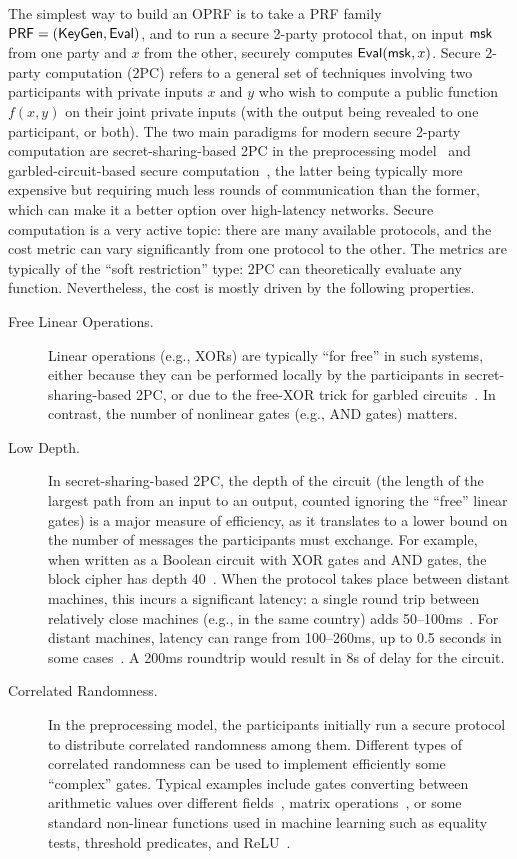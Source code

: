 The simplest way to build an OPRF is to take a PRF family $\mathsf{PRF} = (\mathsf{KeyGen}, \mathsf{Eval})$, and to run a secure 2-party protocol that, on input $\mathsf{msk}$ from one party and $x$ from the other, securely computes $\mathsf{Eval}(\mathsf{msk},x)$. Secure $2$-party computation (2PC) refers to a general set of techniques involving two participants with private inputs $x$ and $y$ who wish to compute a public function $f(x,y)$ on their joint private inputs (with the output being revealed to one participant, or both). The two main paradigms for modern secure 2-party computation are secret-sharing-based 2PC in the preprocessing model~\cite{STOC:GolMicWig87,AC:FKOS15,CCS:KelOrsSch16,C:DPSZ12,EC:KelPasRot18} and garbled-circuit-based secure computation~\cite{FOCS:Yao86,ICALP:KolSch08,EC:ZahRosEva15,CCS:WanRanKat17b,CCS:WanRanKat17a,C:DILO22,EC:CWYY23}, the latter being typically more expensive but requiring much less rounds of communication than the former, which can make it a better option over high-latency networks. Secure computation is a very active topic: there are many available protocols, and the cost metric can vary significantly from one protocol to the other. The metrics are typically of the ``soft restriction'' type: 2PC can theoretically evaluate any function. Nevertheless, the cost is mostly driven by the following properties.
\begin{description}
\item[Free Linear Operations.] Linear operations (e.g., XORs) are typically ``for free'' in such systems, either because they can be performed locally by the participants in secret-sharing-based 2PC, or due to the free-XOR trick for garbled circuits~\cite{ICALP:KolSch08}. In contrast, the number of nonlinear gates (e.g., AND gates) matters.
\item[Low Depth.] In secret-sharing-based 2PC, the depth of the circuit (the length of the largest path from an input to an output, counted ignoring the ``free'' linear gates) is a major measure of efficiency, as it translates to a lower bound on the number of messages the participants must exchange. For example, when written as a Boolean circuit with XOR gates and AND gates, the \aes{} block cipher has depth 40~\cite{EC:ARSTZ15}. When the protocol takes place between distant machines, this incurs a significant latency: a single round trip between relatively close machines (e.g., in the same country) adds 50–100ms~\cite{SP:DKLS19}. For distant machines, latency can range from 100–260ms, up to 0.5 seconds in some cases~\cite{SP:DKLS19}. A 200ms roundtrip would result in 8s of delay for the \aes{} circuit.
\item[Correlated Randomness.] In the preprocessing model, the participants initially run a secure protocol to distribute correlated randomness among them. Different types of correlated randomness can be used to implement efficiently some ``complex'' gates. Typical examples include gates converting between arithmetic values over different fields~\cite{TCC:BIPSW18}, matrix operations~\cite{C:BCGIKS20}, or some standard non-linear functions used in machine learning such as equality tests, threshold predicates, and ReLU~\cite{TCC:BoyGilIsh19,EC:BCGGIK21}.
\end{description}
